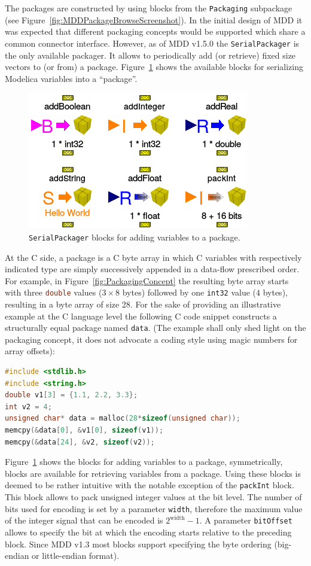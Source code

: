 \documentclass{resources/modelica}
\newcommand{\clang}[1]{\lstinline[language=c]|#1|}
\newcommand{\modelica}[1]{\lstinline[language=modelica]|#1|}
\begin{document}
The packages are constructed by using blocks from the \modelica{Packaging}
subpackage (see Figure~\ref{fig:MDDPackageBrowseScreenshot}). In the initial
design of MDD it was expected that different packaging concepts would be
supported which share a common connector interface. However, as of MDD v1.5.0
the \modelica{SerialPackager} is the only available packager. It allows
to periodically add (or retrieve) fixed size vectors to (or from) a package.
Figure~\ref{fig:SerialPackagerBlocks} shows the available blocks for serializing
Modelica variables into a ``package''.
\begin{figure}[htb]
  \centering
  \includegraphics[width=0.6\columnwidth]{figures/SerialPackagerBlocks}
  \caption{\modelica{SerialPackager} blocks for adding variables to a package.}
  \label{fig:SerialPackagerBlocks}
\end{figure}

At the C side, a package is a C byte array in which C variables with
respectively indicated type are simply successively appended in a data-flow
prescribed order. For example, in Figure~\ref{fig:PackagingConcept} the
resulting byte array starts with three \clang{double} values ($3 \times 8$ bytes)
followed by one \clang{int32} value ($4$ bytes), resulting in a byte array of size 28.
For the sake of providing an illustrative example at the C language level
the following C code snippet constructs a structurally equal package named
\clang{data}. (The example shall only shed light on the packaging concept, it does not
advocate a coding style using magic numbers for array offsets):
\begin{lstlisting}[language=C]
#include <stdlib.h>
#include <string.h>
double v1[3] = {1.1, 2.2, 3.3};
int v2 = 4;
unsigned char* data = malloc(28*sizeof(unsigned char));
memcpy(&data[0], &v1[0], sizeof(v1));
memcpy(&data[24], &v2, sizeof(v2));
\end{lstlisting}

Figure~\ref{fig:SerialPackagerBlocks} shows the blocks for adding
variables to a package, symmetrically, blocks are available for retrieving variables from a
package. Using these blocks is deemed to be rather
intuitive with the notable exception of the \modelica{packInt} block. This
block allows to pack unsigned integer values at the bit level. The number of
bits used for encoding is set by a parameter \modelica{width}, therefore the maximum value
of the integer signal that can be encoded is $2^{\mathrm{width}} - 1$. A
parameter \modelica{bitOffset} allows to specify the bit at which the encoding starts
relative to the preceding block. Since MDD v1.3 most blocks support specifying
the byte ordering (big-endian or little-endian format).
\end{document}
